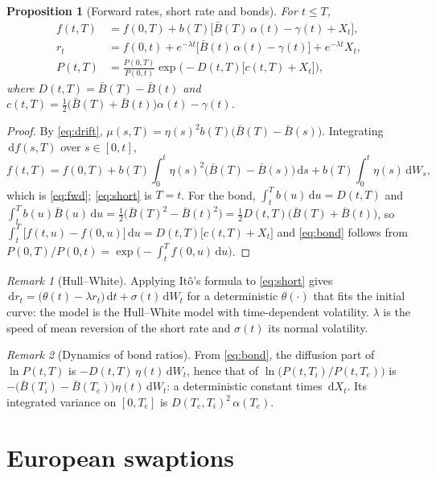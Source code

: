 \documentclass[11pt,a4paper]{article}
\newtheorem{proposition}{Proposition}
\theoremstyle{definition}
\theoremstyle{remark}
\newtheorem{remark}{Remark}
\newcommand{\Bb}{\bar B}
\newcommand{\dd}{\,\mathrm{d}}
\begin{document}
\begin{proposition}[Forward rates, short rate and bonds]\label{prop:bonds}
For $t\le T$,
\begin{align}
  f(t,T)&=f(0,T)+b(T)\big[\Bb(T)\,\alpha(t)-\gamma(t)+X_t\big],\label{eq:fwd}\\
  r_t&=f(0,t)+e^{-\lambda t}\big[\Bb(t)\,\alpha(t)-\gamma(t)\big]+e^{-\lambda t}X_t,\label{eq:short}\\
  P(t,T)&=\frac{P(0,T)}{P(0,t)}\exp\Big(-D(t,T)\big[c(t,T)+X_t\big]\Big),\label{eq:bond}
\end{align}
where $D(t,T)=\Bb(T)-\Bb(t)$ and $c(t,T)=\tfrac12\big(\Bb(T)+\Bb(t)\big)\alpha(t)-\gamma(t)$.
\end{proposition}
\begin{proof}
By \eqref{eq:drift}, $\mu(s,T)=\eta(s)^2b(T)\big(\Bb(T)-\Bb(s)\big)$. Integrating $\dd f(s,T)$ over $s\in[0,t]$,
\[
  f(t,T)=f(0,T)+b(T)\int_0^t\eta(s)^2\big(\Bb(T)-\Bb(s)\big)\dd s+b(T)\int_0^t\eta(s)\dd W_s,
\]
which is \eqref{eq:fwd}; \eqref{eq:short} is $T=t$. For the bond, $\int_t^Tb(u)\dd u=D(t,T)$ and
$\int_t^Tb(u)\Bb(u)\dd u=\tfrac12\big(\Bb(T)^2-\Bb(t)^2\big)=\tfrac12D(t,T)\big(\Bb(T)+\Bb(t)\big)$, so
$\int_t^T\big[f(t,u)-f(0,u)\big]\dd u=D(t,T)\big[c(t,T)+X_t\big]$ and \eqref{eq:bond} follows from
$P(0,T)/P(0,t)=\exp\big(-\int_t^Tf(0,u)\dd u\big)$.
\end{proof}

\begin{remark}[Hull--White]
Applying It\^o's formula to \eqref{eq:short} gives $\dd r_t=\big(\theta(t)-\lambda r_t\big)\dd t+\sigma(t)\dd W_t$ for a
deterministic $\theta(\cdot)$ that fits the initial curve: the model is the Hull--White model with time-dependent volatility.
$\lambda$ is the speed of mean reversion of the short rate and $\sigma(t)$ its normal volatility.
\end{remark}

\begin{remark}[Dynamics of bond ratios]\label{rem:ratio}
From \eqref{eq:bond}, the diffusion part of $\ln P(t,T)$ is $-D(t,T)\,\eta(t)\dd W_t$, hence that of
$\ln\big(P(t,T_i)/P(t,T_e)\big)$ is $-\big(\Bb(T_i)-\Bb(T_e)\big)\eta(t)\dd W_t$: a deterministic constant times $\dd X_t$.
Its integrated variance on $[0,T_e]$ is $D(T_e,T_i)^2\,\alpha(T_e)$.
\end{remark}

\section{European swaptions}\label{sec:europeans}
\end{document}
